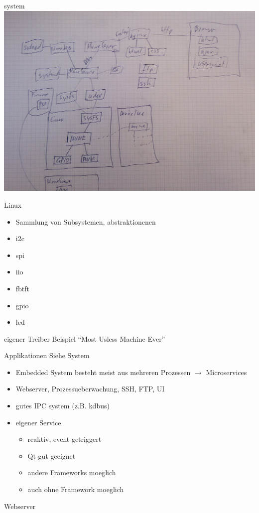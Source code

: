 \begin{frame}{system}
	\includegraphics[width=\textwidth]{res/system.jpg}
\end{frame}

\begin{frame}{Linux}
	\begin{itemize}
		\item Sammlung von Subsystemen, abstraktionenen
		\item i2c
		\item spi
		\item iio
		\item fbtft
		\item gpio
		\item led
	\end{itemize}
\end{frame}

\begin{frame}{eigener Treiber}
	Beispiel ``Most Usless Machine Ever''
\end{frame}

\begin{frame}{Applikationen}
	Siehe System
	\begin{itemize}
		\item Embedded System besteht meist aus mehreren Prozessen $\rightarrow$ Microservices
		\item Webserver, Prozessueberwachung, SSH, FTP, UI
		\item gutes IPC system (z.B. kdbus)
		\item eigener Service
		\begin{itemize}
			\item reaktiv, event-getriggert
			\item Qt gut geeignet
			\item andere Frameworks moeglich
			\item auch ohne Framework moeglich
		\end{itemize}
	\end{itemize}
\end{frame}

\begin{frame}{Webserver}
\end{frame}